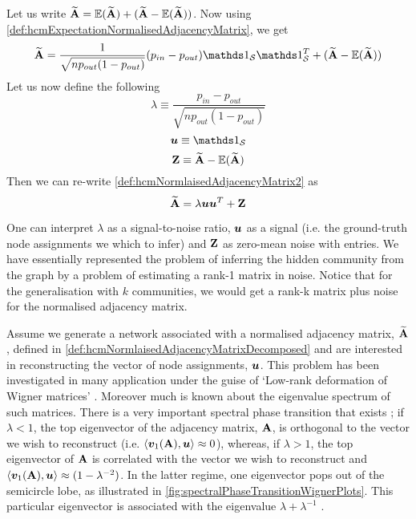 Let us write $\widetilde{\mathbf A} = \mathbb{E}(\widetilde{\mathbf A}) + (\widetilde{\mathbf A} - \mathbb{E}(\widetilde{\mathbf A}))$. Now using \cref{def:hcmExpectationNormalisedAdjacencyMatrix}, we get
\begin{equation}
	\label{def:hcmNormlaisedAdjacencyMatrix2}
	\widetilde{\matvar{A}} = \frac{1}{\sqrt{np_{out}(1-p_{out})}} (p_{in} - p_{out}) \one_{\setvar{S}}\transpose{\one_{\setvar{S}}} + (\widetilde{\matvar{A}} - \expectation{\widetilde{\matvar{A}}})
\end{equation}
Let us now define the following
\begin{equation}
	\label{def:hcmLambda}
	\lambda \equiv \frac{p_{in} - p_{out}}{\sqrt{np_{out}(1-p_{out})}}
\end{equation}
\begin{equation}
	\label{def:hcmU}
	\vecvar{u} \equiv \one_{\setvar{S}}
\end{equation}
\begin{equation}
	\label{def:hcmZ}
	\mathbf Z \equiv \widetilde{\mathbf A} - \mathbb{E}(\widetilde{\mathbf A})
\end{equation}
Then we can re-write \cref{def:hcmNormlaisedAdjacencyMatrix2} as
\begin{equation}
	\label{def:hcmNormlaisedAdjacencyMatrixDecomposed}
	\widetilde{\matvar{A}} = \lambda \vecvar{u}\transpose{\vecvar{u}} + \matvar{Z}
\end{equation}

One can interpret $\lambda$ as a signal-to-noise ratio, $\vecvar{u}$ as a signal (i.e. the ground-truth node assignments we which to infer) and $\mathbf Z$ as zero-mean noise with \iid entries.
We have essentially represented the problem of inferring the hidden community from the graph by a problem of estimating a rank-1 matrix in noise. Notice that for the generalisation with $k$ communities, we would get a rank-k matrix plus noise for the normalised adjacency matrix.

Assume we generate a network associated with a normalised adjacency matrix, $\widetilde{\mathbf A}$, defined in \cref{def:hcmNormlaisedAdjacencyMatrixDecomposed} and are interested in reconstructing the vector of node assignments, $\vecvar{u}$.
This problem has been investigated in many application under the guise of `Low-rank deformation of Wigner matrices' \cite{Mon13}.
Moreover much is known about the eigenvalue spectrum of such matrices. There is a very important spectral phase transition that exists \cite{Mon13}; if $\lambda < 1$, the top eigenvector of the adjacency matrix, $\mathbf A$, is orthogonal to the vector we wish to reconstruct (i.e. $\innerP{\vecvar{v}_{1}(\matvar{A}),\vecvar{u} } \approx 0$), whereas, if $\lambda > 1$, the top eigenvector of $\mathbf A$ is correlated with the vector we wish to reconstruct and $\innerP{\vecvar{v}_{1}(\matvar{A}),\vecvar{u}} \approx (1 - \lambda^{-2})$.
In the latter regime, one eigenvector pops out of the semicircle lobe, as illustrated in \cref{fig:spectralPhaseTransitionWignerPlots}.
This particular eigenvector is associated with the eigenvalue $\lambda + \lambda^{-1}$ \cite{Mon13}.

